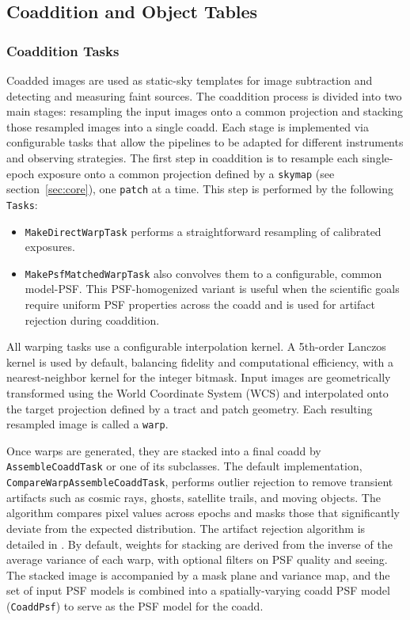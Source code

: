 \subsection{Coaddition and Object Tables}

\subsubsection{Coaddition Tasks}
\label{sec:coaddition}

Coadded images are used as static-sky templates for image subtraction and detecting and measuring faint sources.
The coaddition process is divided into two main stages: resampling the input images onto a common projection and stacking those resampled images into a single coadd.
Each stage is implemented via configurable tasks that allow the pipelines to be adapted for different instruments and observing strategies.
The first step in coaddition is to resample each single-epoch exposure onto a common projection defined by a \texttt{skymap} (see section~\ref{sec:core}), one \texttt{patch} at a time.
This step is performed by the following \texttt{Tasks}:
\begin{itemize}
\item \texttt{MakeDirectWarpTask} performs a straightforward resampling of calibrated exposures.
 \item \texttt{MakePsfMatchedWarpTask} also convolves them to a configurable, common model-PSF.
 This PSF-homogenized variant is useful when the scientific goals require uniform PSF properties across the coadd and is used for artifact rejection during coaddition.
 \end{itemize}

All warping tasks use a configurable interpolation kernel. A 5th-order Lanczos kernel is used by default, balancing fidelity and computational efficiency, with a nearest-neighbor kernel for the integer bitmask.
Input images are geometrically transformed using the World Coordinate System (WCS) and interpolated onto the target projection defined by a tract and patch geometry.
Each resulting resampled image is called a \texttt{warp}.

Once warps are generated, they are stacked into a final coadd by \texttt{AssembleCoaddTask} or one of its subclasses.
The default implementation, \texttt{CompareWarpAssembleCoaddTask}, performs outlier rejection to remove transient artifacts such as cosmic rays, ghosts, satellite trails, and moving objects.
The algorithm compares pixel values across epochs and masks those that significantly deviate from the expected distribution.
The artifact rejection algorithm is detailed in \citet{DMTN-080}.
By default, weights for stacking are derived from the inverse of the average variance of each warp, with optional filters on PSF quality and seeing.
The stacked image is accompanied by a mask plane and variance map, and the set of input PSF models is combined into a spatially-varying coadd PSF model (\texttt{CoaddPsf}) to serve as the PSF model for the coadd.

